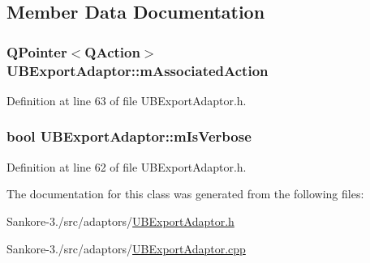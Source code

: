 \subsection{Member Data Documentation}
\hypertarget{class_u_b_export_adaptor_a8345c9797470e5b5af71b98fe936cded}{
\subsubsection[{m\-Associated\-Action}]{\setlength{\rightskip}{0pt plus 5cm}Q\-Pointer$<$Q\-Action$>$ U\-B\-Export\-Adaptor\-::m\-Associated\-Action\hspace{0.3cm}{\ttfamily [protected]}}}\label{d8/dd5/class_u_b_export_adaptor_a8345c9797470e5b5af71b98fe936cded}


Definition at line 63 of file U\-B\-Export\-Adaptor.\-h.

\hypertarget{class_u_b_export_adaptor_ae07fa34ac60fbd228314181ff53c3a62}{
\subsubsection[{m\-Is\-Verbose}]{\setlength{\rightskip}{0pt plus 5cm}bool U\-B\-Export\-Adaptor\-::m\-Is\-Verbose\hspace{0.3cm}{\ttfamily [protected]}}}\label{d8/dd5/class_u_b_export_adaptor_ae07fa34ac60fbd228314181ff53c3a62}


Definition at line 62 of file U\-B\-Export\-Adaptor.\-h.



The documentation for this class was generated from the following files\-:\begin{DoxyCompactItemize}
\item 
Sankore-\/3./src/adaptors/\hyperlink{_u_b_export_adaptor_8h}{U\-B\-Export\-Adaptor.\-h}\item 
Sankore-\/3./src/adaptors/\hyperlink{_u_b_export_adaptor_8cpp}{U\-B\-Export\-Adaptor.\-cpp}\end{DoxyCompactItemize}
